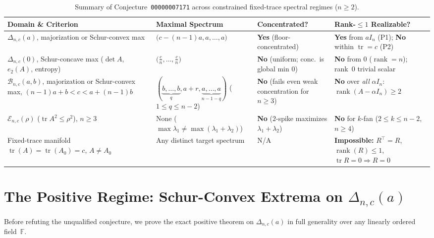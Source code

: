 \documentclass[11pt]{article}
\theoremstyle{definition}
\theoremstyle{remark}
\newcommand{\tr}{\operatorname{tr}}
\newcommand{\rk}{\operatorname{rank}}
\begin{document}
\begin{table}[htbp]
\centering
\caption{Summary of Conjecture~\texttt{00000007171} across constrained fixed-trace spectral regimes ($n \ge 2$).}
\label{tab:regimes}
\small
\begin{tabular}{@{}p{}p{}p{}p{}@{}}
\toprule
\textbf{Domain \& Criterion} & \textbf{Maximal Spectrum} & \textbf{Concentrated?} & \textbf{Rank-$\le 1$ Realizable?} \\
\midrule
$\Delta_{n,c}(a)$, majorization or Schur-convex max &
$\bigl(c - (n-1)a, a, \dots, a\bigr)$ &
\textbf{Yes} (floor-concentrated) &
\textbf{Yes} from $a I_n$ (P1); \textbf{No} within $\tr = c$ (P2) \\
\addlinespace[3pt]
$\Delta_{n,c}(0)$, Schur-concave max ($\det A$, $e_2(A)$, entropy) &
$\bigl(\tfrac{c}{n}, \dots, \tfrac{c}{n}\bigr)$ &
\textbf{No} (uniform; conc.\ is global min $0$) &
\textbf{No} from $0$ ($\rk = n$); rank~$0$ trivial scalar \\
\addlinespace[3pt]
$\mathcal{B}_{n,c}(a,b)$, majorization or Schur-convex max, $(n-1)a+b < c < a+(n-1)b$ &
$(\underbrace{b,\dots,b}_{q}, a+r, \underbrace{a,\dots,a}_{n-1-q})$ ($1 \le q \le n-2$) &
\textbf{No} (fails even weak concentration for $n \ge 3$) &
\textbf{No} over \emph{all} $\alpha I_n$: $\rk(A - \alpha I_n) \ge 2$ \\
\addlinespace[3pt]
$\mathcal{E}_{n,c}(\rho)$ ($\tr A^2 \le \rho^2$), $n \ge 3$ &
None ($\max \lambda_1 \neq \max(\lambda_1+\lambda_2)$) &
\textbf{No} ($2$-spike maximizes $\lambda_1 + \lambda_2$) &
\textbf{No} for $k$-fan ($2 \le k \le n-2$, $n \ge 4$) \\
\addlinespace[3pt]
Fixed-trace manifold $\tr(A) = \tr(A_0) = c$, $A \neq A_0$ &
Any distinct target spectrum &
N/A &
\textbf{Impossible:} $R^\top = R$, $\rk(R) \le 1$, $\tr R = 0 \Rightarrow R = 0$ \\
\bottomrule
\end{tabular}
\end{table}

\section{The Positive Regime: Schur-Convex Extrema on \texorpdfstring{$\Delta_{n,c}(a)$}{the Lower-Bounded Trace Simplex}}
\label{sec:positive}

Before refuting the unqualified conjecture, we prove the exact positive theorem on $\Delta_{n,c}(a)$ in full generality over any linearly ordered field~$\mathbb{F}$.
\end{document}
